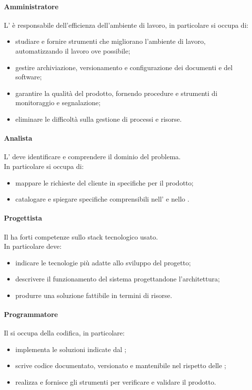  \paragraph{Amministratore}
 L'\AMM{} è responsabile dell'efficienza dell'ambiente di lavoro, in particolare si occupa di:
 \begin{itemize}
  \item studiare e fornire strumenti che migliorano l'ambiente di lavoro, automatizzando il lavoro ove possibile;
  \item gestire archiviazione, versionamento e configurazione dei documenti e del software;
  \item garantire la qualità del prodotto, fornendo procedure e strumenti di monitoraggio e segnalazione;
  \item eliminare le difficoltà sulla gestione di processi e risorse.
 \end{itemize}
 \paragraph{Analista}
 L'\AN{} deve identificare e comprendere il dominio del problema. \\
 In particolare si occupa di:
 \begin{itemize}
  \item mappare le richieste del cliente in specifiche per il prodotto;
  \item catalogare e spiegare specifiche comprensibili nell'\ARdoc{} e nello \SFdoc{}.
 \end{itemize}
 \paragraph{Progettista}
 Il \PJ{} ha forti competenze sullo stack tecnologico usato. \\
 In particolare deve: 
 \begin{itemize}
  \item indicare le tecnologie più adatte allo sviluppo del progetto;
  \item descrivere il funzionamento del sistema progettandone l'architettura;
  \item produrre una soluzione fattibile in termini di risorse.
 \end{itemize}
 \paragraph{Programmatore}
 Il \PR{} si occupa della codifica, in particolare:
 \begin{itemize}
  \item implementa le soluzioni indicate dal \PJ ;
  \item scrive codice documentato, versionato e mantenibile nel rispetto delle \NPdoc ;
  \item realizza e fornisce gli strumenti per verificare e validare il prodotto.
 \end{itemize}
